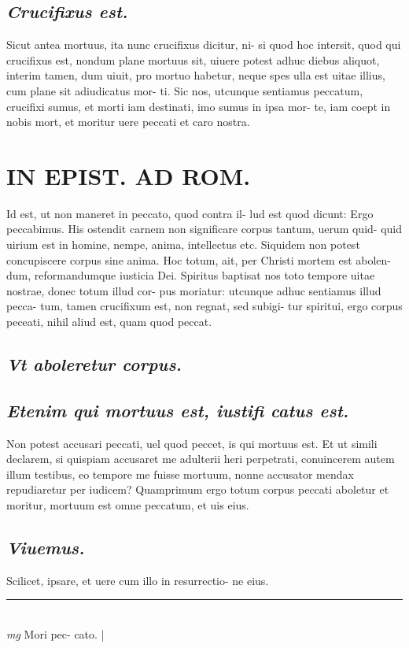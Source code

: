 \documentclass{article}
\begin{document}
\begin{pages}
\subsection*{\textit{Crucifixus est. }}\pstart Sicut antea mortuus, ita nunc crucifixus dicitur, ni- si quod hoc intersit, quod qui crucifixus est, nondum plane mortuus sit, uiuere potest adhuc diebus aliquot, interim tamen, dum uiuit, pro mortuo habetur, neque  spes ulla est uitae illius, cum plane sit adiudicatus mor- ti. Sic nos, utcunque sentiamus peccatum, crucifixi sumus, et morti iam destinati, imo sumus in ipsa mor- te, iam coept in nobis mort, et moritur uere peccati et caro nostra.   \pend
\section*{IN EPIST. AD ROM.  }
\marginpar{[ p.61 ]}\pstart Id est, ut non maneret in peccato, quod contra il- lud est quod dicunt: Ergo peccabimus. His ostendit carnem non significare corpus tantum, uerum quid- quid uirium est in homine, nempe, anima, intellectus etc. Siquidem non potest concupiscere corpus sine anima. Hoc totum, ait, per Christi mortem est abolen- dum, reformandumque iusticia Dei. Spiritus baptisat nos toto tempore uitae nostrae, donec totum illud cor- pus moriatur: utcunque adhuc sentiamus illud pecca- tum, tamen crucifixum est, non regnat, sed subigi- tur spiritui, ergo corpus peceati, nihil aliud est, quam quod peccat.  \pend
{}
{}
\subsection*{\textit{Vt aboleretur corpus. }}
{}
\subsection*{\textit{Etenim qui mortuus est, iustifi catus est. }}\pstart Non potest accusari peccati, uel quod peccet, is qui mortuus est. Et ut simili declarem, si quispiam accusaret me adulterii heri perpetrati, conuincerem autem illum testibus, eo tempore me fuisse mortuum, nonne accusator mendax repudiaretur per iudicem? Quamprimum ergo totum corpus peccati aboletur et moritur, mortuum est omne peccatum, et uis eius.   \pend
{}
{}
\subsection*{\textit{Viuemus. }}\pstart Scilicet, ipsare, et uere cum illo in resurrectio- ne eius.   \pend
\vspace{0.5cm}\noindent
\vspace{0.2cm}\rule{1cm}{0.2pt}\\ 
\hspace{0.2cm}\textit{mg}
\footnotesize Mori pec- cato.  
\normalsize| 

\end{pages}
\end{document}
